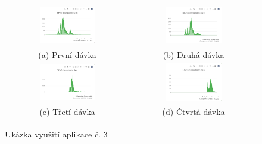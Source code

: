 \begin{figure}[h]
\centering
\begin{tabular}{cc}
  \includegraphics[width=0.47\textwidth]{Pictures/showcase3a.png} &   \includegraphics[width=0.47\textwidth]{Pictures/showcase3b.png} \\
(a) První dávka & (b) Druhá dávka \\[6pt]
 \includegraphics[width=0.47\textwidth]{Pictures/showcase3c.png} &   \includegraphics[width=0.47\textwidth]{Pictures/showcase3d.png} \\
(c) Třetí dávka & (d) Čtvrtá dávka \\[6pt]
\end{tabular}
\caption{Ukázka využití aplikace č. 3}
\label{showcase3}
\end{figure}

\clearpage

